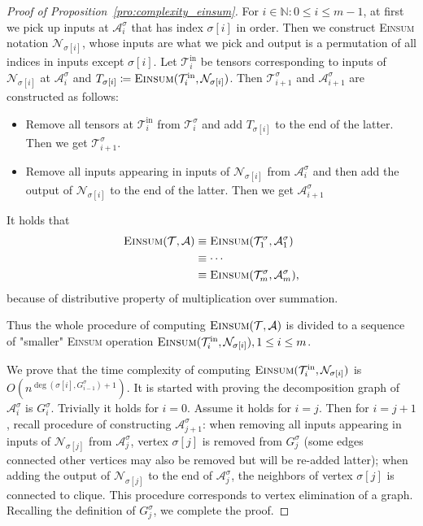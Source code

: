 \documentclass[sn-mathphys, natbib=false]{sn-jnl}
\theoremstyle{plain}
\theoremstyle{definition}
\def\Einsum{\textsc{Einsum}}
\newcommand{\tensorcontraction}{\textsc{Einsum}}
\newcommand{\degp}[2]{\deg(#1,#2)}
\newcommand{\less}{O}
\newcommand{\naturals}{\mathbb{N}}
\def\calA{\mathcal{A}}
\def\calT{\mathcal{T}}
\def\calN{\mathcal{N}}
\begin{document}
\begin{bibunit}[agsm]
\begin{proof}[Proof of Proposition~\ref{pro:complexity_einsum}]
For $i \in \naturals: 0 \leq i \leq m-1$, at first we pick up inputs at $\calA^\sigma_i$ that has index $\sigma[i]$ in order. Then we construct \Einsum{} notation $\calN_{\sigma[i]}$, whose inputs are what we pick and output is a permutation of all indices in inputs except $\sigma[i]$. Let $\calT_i^{\mathrm{in}}$ be tensors corresponding to inputs of $\calN_{\sigma[i]}$ at $\calA^\sigma_i$ and $T_{\sigma[i]} \coloneqq \tensorcontraction(\calT_i^{\mathrm{in}}, \calN_{\sigma[i]})$. Then $\calT^\sigma_{i+1}$ and  $\calA^\sigma_{i+1}$ are constructed as follows:
\begin{itemize}
    \item Remove all tensors at $\calT_i^{\mathrm{in}}$ from $\calT^\sigma_i$ and add $T_{\sigma[i]}$ to the end of the latter. Then we get $\calT^\sigma_{i+1}$. 
    \item Remove all inputs appearing in inputs of $\calN_{\sigma[i]}$ from $\calA^\sigma_i$ and then add the output of $\calN_{\sigma[i]}$ to the end of the latter. Then we get $\calA^\sigma_{i+1}$
\end{itemize}

It holds that
\begin{align*}
    \tensorcontraction(\calT, \calA) & \equiv \tensorcontraction(\calT^\sigma_1, \calA^\sigma_1) \\
    & \equiv \cdots \\
    & \equiv \tensorcontraction(\calT^\sigma_m, \calA^\sigma_m),
\end{align*}
because of distributive property of multiplication over summation. 

Thus the whole procedure of computing $\tensorcontraction(\calT, \calA)$ is divided to a sequence of "smaller" \Einsum{} operation $\tensorcontraction(\calT_i^{\mathrm{in}}, \calN_{\sigma[i]}), 1 \leq i \leq m$. 

We prove that the time complexity of computing $\tensorcontraction(\calT_i^{\mathrm{in}},\calN_{\sigma[i]})$ is $\less(n^{\degp{\sigma[i]}{G^\sigma_{i-1}}+1})$. 
It is started with proving the decomposition graph of $\calA^\sigma_i$ is $G^\sigma_i$. Trivially it holds for $i=0$. Assume it holds for $i = j$. Then for $i=j+1$, recall procedure of constructing $\calA^\sigma_{j+1}$: when removing all inputs appearing in inputs of $\calN_{\sigma[j]}$ from $\calA^\sigma_j$, vertex $\sigma[j]$ is removed from $G^\sigma_j$ (some edges connected other vertices may also be removed but will be re-added latter); when adding the output of $\calN_{\sigma[j]}$ to the end of $\calA^\sigma_j$, the neighbors of vertex $\sigma[j]$ is connected to clique. This procedure corresponds to vertex elimination of a graph. Recalling the definition of $G^\sigma_j$, we complete the proof. 


\end{proof}
\end{bibunit}
\end{document}
